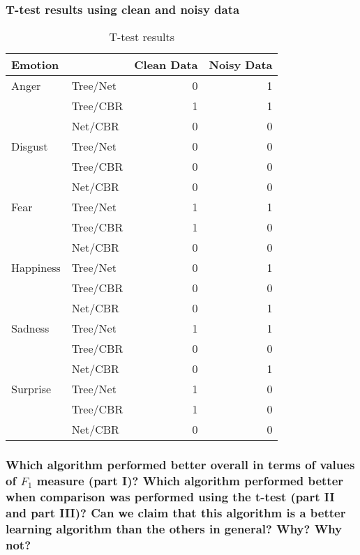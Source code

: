 \documentclass[12pt]{article}
\begin{document}
\subsubsection*{T-test results using clean and noisy data}
\begin{table}[h]
\centering
\begin{tabular}{l l | r r}
Emotion   &          & Clean Data & Noisy Data \\
\hline
Anger     & Tree/Net & 0          & 1          \\
          & Tree/CBR & 1          & 1          \\
          & Net/CBR  & 0          & 0          \\
Disgust   & Tree/Net & 0          & 0          \\
          & Tree/CBR & 0          & 0          \\
          & Net/CBR  & 0          & 0          \\
Fear      & Tree/Net & 1          & 1          \\
          & Tree/CBR & 1          & 0          \\
          & Net/CBR  & 0          & 0          \\
Happiness & Tree/Net & 0          & 1          \\
          & Tree/CBR & 0          & 0          \\
          & Net/CBR  & 0          & 1          \\
Sadness   & Tree/Net & 1          & 1          \\
          & Tree/CBR & 0          & 0          \\
          & Net/CBR  & 0          & 1          \\
Surprise  & Tree/Net & 1          & 0          \\
          & Tree/CBR & 1          & 0          \\
          & Net/CBR  & 0          & 0          \\
\end{tabular}
\caption{T-test results}
\end{table}

\subsubsection*{Which algorithm performed better overall in terms of values of $F_1$ measure (part I)? Which algorithm performed better when comparison was performed using the t-test (part II and part III)? Can we claim that this algorithm is a better learning algorithm than the others in general? Why? Why not?}
\end{document}
